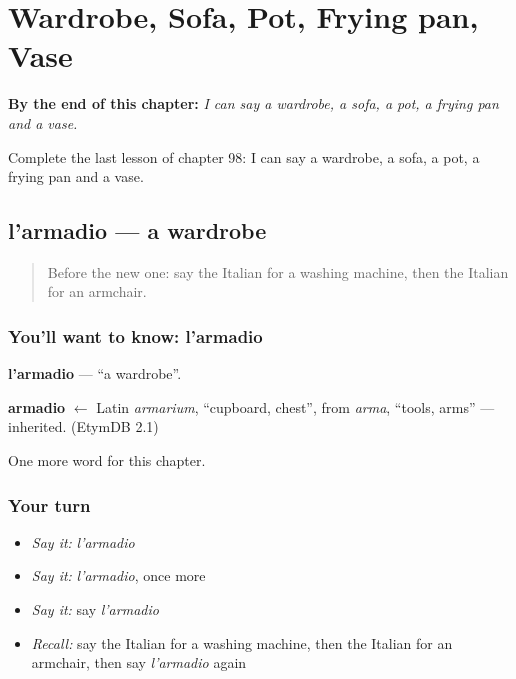 
\chapter{Wardrobe, Sofa, Pot, Frying pan, Vase}
\label{ch:it-wardrobe-sofa-pot-frying-pan-vase}

\begin{chapteropening}
\textbf{By the end of this chapter:} \emph{I can say a wardrobe, a sofa, a pot, a frying pan and a vase.}

Complete the last lesson of chapter 98: I can say a wardrobe, a sofa, a pot, a frying pan and a vase.
\end{chapteropening}

\section[l'armadio]{l'armadio — a wardrobe}

\label{lesson:IT-C98-armadio}



\begin{quote}
Before the new one: say the Italian for a washing machine, then the Italian for an armchair.
\end{quote}

\subsection*{You'll want to know: l'armadio}
\textbf{l'armadio} — \textquotedblleft{}a wardrobe\textquotedblright{}.

\begin{cousinweb}
\textbf{armadio} $\leftarrow$ Latin \emph{armarium}, \textquotedblleft{}cupboard, chest\textquotedblright{}, from \emph{arma}, \textquotedblleft{}tools, arms\textquotedblright{} — inherited. (EtymDB 2.1)
\end{cousinweb}

\begin{grammarlens}[title={What you've built}]
One more word for this chapter.
\end{grammarlens}

\subsection*{Your turn}
\begin{itemize}
\raggedright
  \item \emph{Say it:} \emph{l'armadio}
  \item \emph{Say it:} \emph{l'armadio}, once more
  \item \emph{Say it:} say \emph{l'armadio}
  \item \emph{Recall:} say the Italian for a washing machine, then the Italian for an armchair, then say \emph{l'armadio} again
\end{itemize}

